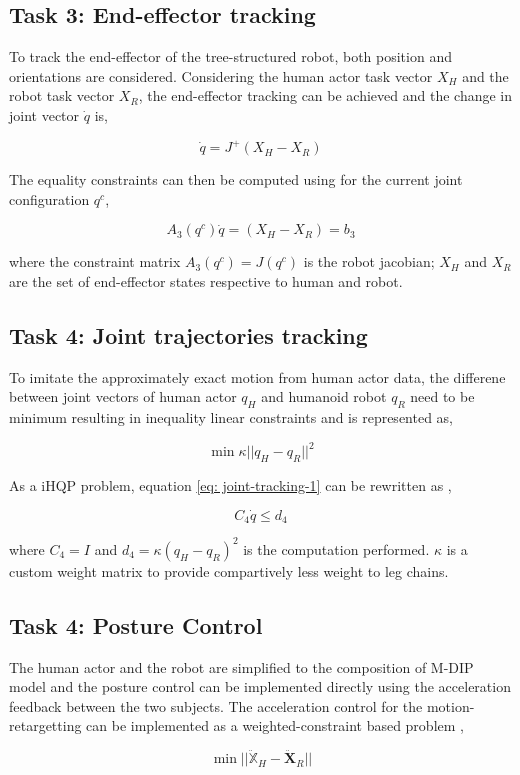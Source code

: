 \subsection[End-effector tracking]{Task 3: End-effector tracking}

To track the end-effector of the tree-structured robot, both position and orientations are considered. Considering the human actor task vector $X_H$ and the robot task vector $X_R$,
the end-effector tracking can be achieved and the change in joint vector $\dot{q}$ is,

\begin{equation}
    \label{eq: end-effector-tracking-1}
    \dot{q} = J^+(X_H - X_R)   
\end{equation}

The equality constraints can then be computed using for the current joint configuration $q^c$,

\begin{equation}
    \label{eq: end-effector-tracking-2}
    A_{3}(q^c)\dot{q} = (X_H - X_R) = b_3
\end{equation}

where the constraint matrix $A_3(q^c) = J(q^c)$ is the robot jacobian; $X_H$ and $X_R$ are the set of end-effector states respective to human and robot.

\subsection[Joint trajectories tracking]{Task 4: Joint trajectories tracking}

To imitate the approximately exact motion from human actor data, the differene between joint vectors of human actor $q_H$ and humanoid robot $q_R$ need to be minimum resulting in 
inequality linear constraints and is represented as,

\begin{equation}
    \label{eq: joint-tracking-1}
    \min \kappa ||q_H - q_R||^2
\end{equation}

As a iHQP problem, equation \ref{eq: joint-tracking-1} can be rewritten as ,

\begin{equation}
    C_4\dot{q} \le d_4
\end{equation}

where $C_4 = I$ and $d_4 = \kappa(q_H - q_R)^2 $ is the computation performed. $\kappa$ is a custom weight matrix to provide compartively less weight to leg chains.
\subsection[Posture Control]{Task 4: Posture Control}
The human actor and the robot are simplified to the composition of M-DIP model and the posture control can be implemented directly using the acceleration feedback between the 
two subjects. The acceleration control for the motion-retargetting can be implemented as a weighted-constraint based problem \cite{van1985method},

\begin{equation}
    \label{eq: posture-control-1}
    \min ||\ddot{\mathbb{X}}_H - \ddot{\mathbf{X}}_R||
\end{equation}

